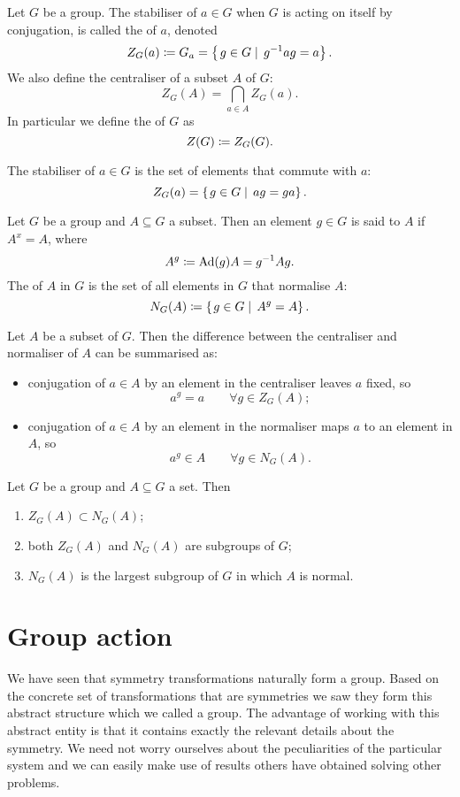 \begin{definition}
Let $G$ be a group. The stabiliser of $a\in G$ when $G$ is acting on itself by conjugation, is called the  of $a$, denoted
\[ Z_G(a) \coloneqq G_a = \left\{\left. g\in G \;\right|\; g^{-1}ag = a \right\}. \]
We also define the centraliser of a subset $A$ of $G$:
\[ Z_G(A) = \bigcap_{a\in A}Z_G(a). \]
In particular we define the  of $G$ as
\[ Z(G) \coloneqq Z_G(G). \]
\end{definition}
The stabiliser of $a\in G$ is the set of elements that commute with $a$:
\[ Z_G(a) = \left\{\left. g\in G \;\right|\; ag = ga \right\}. \]


\begin{definition}
Let $G$ be a group and $A\subseteq G$ a subset. Then an element $g\in G$ is said to  $A$ if $A^x = A$, where
\[ A^g \coloneqq \operatorname{Ad}(g)A = g^{-1}Ag. \]
The  of $A$ in $G$ is the set of all elements in $G$ that normalise $A$:
\[ N_G(A) \coloneqq \left\{\left. g\in G \;\right|\; A^g = A \right\}. \]
\end{definition}
Let $A$ be a subset of $G$. Then the difference between the centraliser and normaliser of $A$ can be summarised as:
\begin{itemize}
\item conjugation of $a\in A$ by an element in the centraliser leaves $a$ fixed, so
\[ a^g = a \qquad \forall g\in Z_G(A); \]
\item conjugation of $a\in A$ by an element in the normaliser maps $a$ to an element in $A$, so
\[ a^g \in A \qquad \forall g\in N_G(A). \]
\end{itemize}
\begin{lemma}
Let $G$ be a group and $A\subseteq G$ a set. Then
\begin{enumerate}
\item $Z_G(A) \subset N_G(A)$;
\item both $Z_G(A)$ and $N_G(A)$ are subgroups of $G$;
\item $N_G(A)$ is the largest subgroup of $G$ in which $A$ is normal.
\end{enumerate}
\end{lemma}







\section{Group action}
We have seen that symmetry transformations naturally form a group. Based on the concrete set of transformations that are symmetries we saw they form this abstract structure which we called a group. The advantage of working with this abstract entity is that it contains exactly the relevant details about the symmetry. We need not worry ourselves about the peculiarities of the particular system and we can easily make use of results others have obtained solving other problems.

